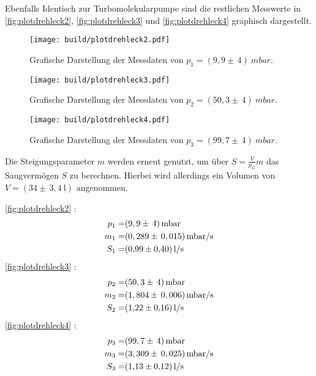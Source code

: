 \noindent
Ebenfalls Identisch zur Turbomolekularpumpe sind die restlichen Messwerte in \autoref{fig:plotdrehleck2}, \autoref{fig:plotdrehleck3}
und \autoref{fig:plotdrehleck4} graphisch dargestellt.

\begin{figure}[H]
  \centering
  \texttt{[image: build/plotdrehleck2.pdf]}
  \caption{Grafische Darstellung der Messdaten von $p_1 = (9,9 \pm \, 4) \: \si{mbar}$.}
  \label{fig:plotdrehleck2}
\end{figure}

\begin{figure}[H]
  \centering
  \texttt{[image: build/plotdrehleck3.pdf]}
  \caption{Grafische Darstellung der Messdaten von $p_2 = (50,3 \pm \, 4) \: \si{mbar}$.}
  \label{fig:plotdrehleck3}
\end{figure}

\begin{figure}[H]
  \centering
  \texttt{[image: build/plotdrehleck4.pdf]}
  \caption{Grafische Darstellung der Messdaten von $p_3 = (99,7 \pm \, 4) \: \si{mbar}$.}
  \label{fig:plotdrehleck4}
\end{figure}

\noindent
Die Steigungsparameter $m$ werden erneut genutzt, um über $S=\frac{V}{p_G}m$ das Saugvermögen $S$ zu berechnen.
Hierbei wird allerdings ein Volumen von $V = (34 \pm \, 3,4 \: \si{\litre})$ angenommen.

\noindent
\autoref{fig:plotdrehleck2} :
	\begin{align*}
		p_1 =& (9,9 \pm \, 4) \, \si{mbar}\\
		m_1 =& (0,289 \pm \, 0,015) \, \si{mbar/s}\\
		S_1 =& \SI{0,99 \pm 0,40}{l/s}
\end{align*}
\autoref{fig:plotdrehleck3} :
	\begin{align*}
		p_2 =& (50,3 \pm \, 4) \, \si{mbar}\\
		m_2 =& (1,804 \pm \, 0,006) \, \si{mbar/s}\\
		S_2 =& \SI{1,22 \pm 0,16}{l/s}
\end{align*}
\autoref{fig:plotdrehleck4} :
	\begin{align*}
		p_3 =& (99,7 \pm \, 4) \, \si{mbar}\\
		m_3 =& (3,309 \pm \, 0,025) \, \si{mbar/s}\\
		S_3 =& \SI{1,13 \pm 0,12}{l/s}
\end{align*}





